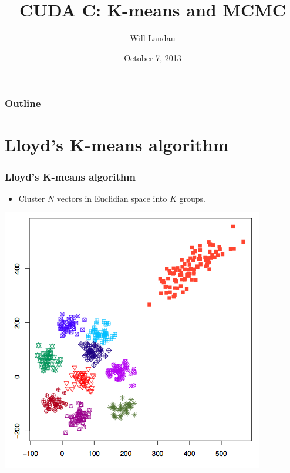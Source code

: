 \documentclass[handout]{beamer}
\title{CUDA C: K-means and MCMC}
\author{Will Landau}
\date{October 7, 2013}
\institute{Iowa State University}
\numberwithin{equation}{section}
\begin{document}
\begin{frame}
\titlepage
 \end{frame}

\begin{frame}
\frametitle{Outline}
\tableofcontents
\end{frame}
 

\section{Lloyd's K-means algorithm}

\begin{frame}
\frametitle{Lloyd's K-means algorithm}
\begin{itemize}
\item Cluster $N$ vectors in Euclidian space into $K$ groups. 
\end{itemize}

\begin{center}
\includegraphics[scale=.4]{../../fig/kmeans0.png}
\end{center}
\end{frame}
\end{document}

